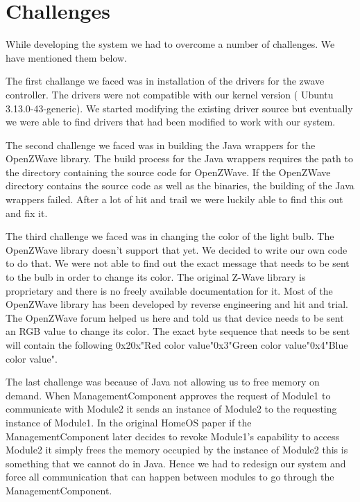 \section{Challenges}
\label{sec:challenges}
While developing the system we had to overcome a number of challenges. We have 
mentioned them below.

The first challange we faced was in installation of the drivers for the zwave
controller. The drivers were not compatible with our kernel version ( Ubuntu 
3.13.0-43-generic). We started modifying the existing driver source but 
eventually we were able to find drivers that had been modified to work with our
system.

The second challenge we faced was in building the Java wrappers for the
OpenZWave library. The build process for the Java wrappers requires the path to
the directory containing the source code for OpenZWave. If the OpenZWave
directory contains the source code as well as the binaries, the building of the
Java wrappers failed. After a lot of hit and trail we were luckily able to find
this out and fix it.

The third challenge we faced was in changing the color of the light bulb. The
OpenZWave library doesn't support that yet. We decided to write our own code to
do that. We were not able to find out the exact message that needs to be sent to
the bulb in order to change its color. The original Z-Wave library is
proprietary and there is no freely available documentation for it. Most of the 
OpenZWave library has been developed by reverse engineering and hit and trial.
The OpenZWave forum helped us here and told us that device needs to be sent an
RGB value to change its color. The exact byte sequence that needs to be sent
will contain the following
0x20x"Red color value"0x3"Green color value"0x4"Blue color value".

The last challenge was because of Java not allowing us to free memory on demand.
When ManagementComponent approves the request of Module1 to communicate with
Module2 it sends an instance of Module2 to the requesting instance of Module1.
In the original HomeOS paper if the ManagementComponent later decides to revoke
Module1's capability to access Module2 it simply frees the memory occupied by
the instance of Module2 this is something that we cannot do in Java. Hence we 
had to redesign our system and force all communication that can happen between
modules to go through the ManagementComponent.  
